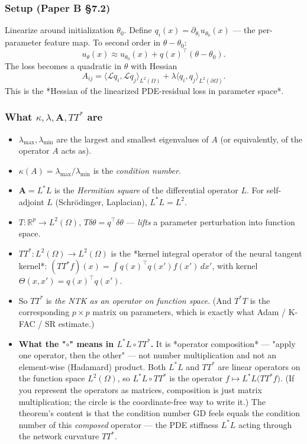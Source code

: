 \documentclass[11pt]{article}
\begin{document}
\subsubsection*{Setup (Paper B \S{}7.2)}

Linearize around initialization $\theta_0$. Define $q_i(x) =
\partial_{\theta_i} u_{\theta_0}(x)$ --- the per-parameter feature map. To
second order in $\theta - \theta_0$:
\[u_\theta(x) \approx u_{\theta_0}(x) + q(x)^\top (\theta - \theta_0).\]
The loss becomes a quadratic in $\theta$ with Hessian
\[A_{ij} = \langle \mathcal L q_i, \mathcal L q_j \rangle_{L^2(\Omega)}
+ \lambda \langle q_i, q_j\rangle_{L^2(\partial \Omega)}.\]
This is the *Hessian of the linearized PDE-residual loss in parameter
space*.

\subsubsection*{What $\kappa, \lambda, \mathbf A, TT^*$ are}

\begin{itemize}
\item $\lambda_{\max}, \lambda_{\min}$ are the largest and smallest eigenvalues
of $A$ (or equivalently, of the operator $A$ acts as).
\item $\kappa(A) = \lambda_{\max} / \lambda_{\min}$ is the \emph{condition number}.
\item $\mathbf A = L^* L$ is the \emph{Hermitian square} of the differential
operator $L$. For self-adjoint $L$ (Schr\"odinger, Laplacian), $L^* L =
  L^2$.
\item $T : \mathbb R^p \to L^2(\Omega)$, $T \delta\theta = q^\top \delta\theta$
--- \emph{lifts} a parameter perturbation into function space.
\item $T T^* : L^2(\Omega) \to L^2(\Omega)$ is the *kernel integral operator
of the neural tangent kernel*: $(T T^* f)(x) = \int q(x)^\top q(x')
  f(x') \, dx'$, with kernel $\Theta(x, x') = q(x)^\top q(x')$.
\item So $T T^*$ is \emph{the NTK as an operator on function space}. (And $T^* T$
is the corresponding $p \times p$ matrix on parameters, which is exactly
what Adam / K-FAC / SR estimate.)
\item \textbf{What the "$\circ$" means in $L^*L \circ TT^*$.} It is *operator
composition* --- "apply one operator, then the other" --- not number
multiplication and not an element-wise (Hadamard) product. Both $L^*L$ and
$TT^*$ are linear operators on the function space $L^2(\Omega)$, so
$L^*L \circ TT^*$ is the operator $f \mapsto L^*L\big(TT^* f\big)$. (If you
represent the operators as matrices, composition is just matrix
multiplication; the circle is the coordinate-free way to write it.) The
theorem's content is that the condition number GD feels equals the
condition number of this \emph{composed} operator --- the PDE stiffness $L^*L$
acting through the network curvature $TT^*$.
\end{itemize}
\end{document}
